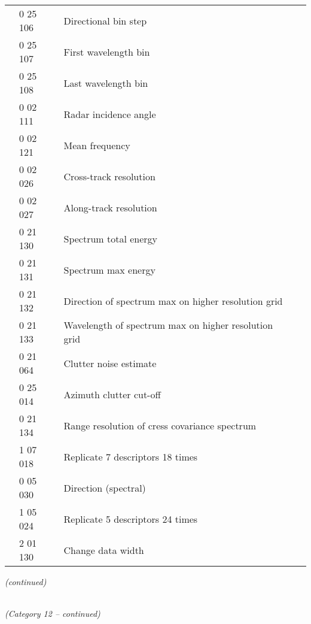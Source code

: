\begin{longtable}[]{@{}llll@{}}
& 0 25 106 & Directional bin step &\tabularnewline
& 0 25 107 & First wavelength bin &\tabularnewline
& 0 25 108 & Last wavelength bin &\tabularnewline
& 0 02 111 & Radar incidence angle &\tabularnewline
& 0 02 121 & Mean frequency &\tabularnewline
& 0 02 026 & Cross-track resolution &\tabularnewline
& 0 02 027 & Along-track resolution &\tabularnewline
& 0 21 130 & Spectrum total energy &\tabularnewline
& 0 21 131 & Spectrum max energy &\tabularnewline
& 0 21 132 & Direction of spectrum max on higher resolution grid &\tabularnewline
& 0 21 133 & Wavelength of spectrum max on higher resolution grid &\tabularnewline
& 0 21 064 & Clutter noise estimate &\tabularnewline
& 0 25 014 & Azimuth clutter cut-off &\tabularnewline
& 0 21 134 & Range resolution of cress covariance spectrum &\tabularnewline
& 1 07 018 & Replicate 7 descriptors 18 times &\tabularnewline
& 0 05 030 & Direction (spectral) &\tabularnewline
& 1 05 024 & Replicate 5 descriptors 24 times &\tabularnewline
& 2 01 130 & Change data width &\tabularnewline
\bottomrule
\end{longtable}

\emph{(continued)}

\emph{\\
(Category 12 -- continued)}

